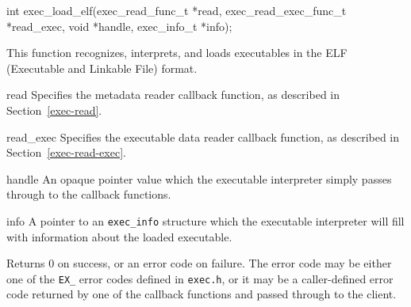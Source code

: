 \begin{apisyn}

	\funcproto int exec_load_elf(exec_read_func_t *read,
				 exec_read_exec_func_t *read_exec,
				 void *handle, \outparam exec_info_t *info);
\end{apisyn}
\begin{apidesc}
	This function recognizes, interprets, and loads executables
	in the ELF (Executable and Linkable File) format.
\end{apidesc}
\begin{apiparm}
	\item[read]
		Specifies the metadata reader callback function,
		as described in Section~\ref{exec-read}.
	\item[read_exec]
		Specifies the executable data reader callback function,
		as described in Section~\ref{exec-read-exec}.
	\item[handle]
		An opaque pointer value
		which the executable interpreter
		simply passes through to the callback functions.
	\item[info]
		A pointer to an \texttt{exec_info} structure
		which the executable interpreter will fill
		with information about the loaded executable.
\end{apiparm}
\begin{apiret}
	Returns 0 on success,
	or an error code on failure.
	The error code may be either
	one of the \texttt{EX_} error codes
	defined in \texttt{exec.h},
	or it may be a caller-defined error code
	returned by one of the callback functions
	and passed through to the client.
\end{apiret}

